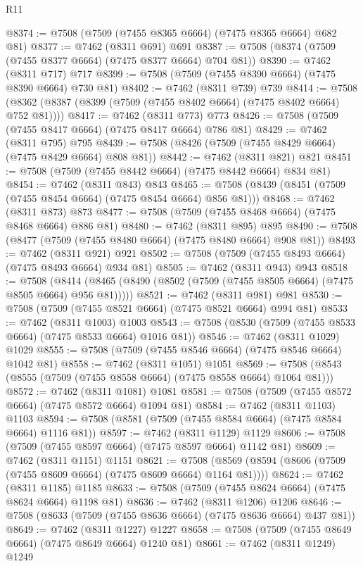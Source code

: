 \begin{lexlean}{R11}
\begin{coremodule}
@8374 := @7508 (@7509 (@7455 @8365 @6664) (@7475 @8365 @6664) @682 @81)
@8377 := @7462 (@8311 @691) @691
@8387 := @7508 (@8374 (@7509 (@7455 @8377 @6664) (@7475 @8377 @6664) @704 @81))
@8390 := @7462 (@8311 @717) @717
@8399 := @7508 (@7509 (@7455 @8390 @6664) (@7475 @8390 @6664) @730 @81)
@8402 := @7462 (@8311 @739) @739
@8414 := @7508 (@8362 (@8387 (@8399 (@7509 (@7455 @8402 @6664) (@7475 @8402 @6664) @752 @81))))
@8417 := @7462 (@8311 @773) @773
@8426 := @7508 (@7509 (@7455 @8417 @6664) (@7475 @8417 @6664) @786 @81)
@8429 := @7462 (@8311 @795) @795
@8439 := @7508 (@8426 (@7509 (@7455 @8429 @6664) (@7475 @8429 @6664) @808 @81))
@8442 := @7462 (@8311 @821) @821
@8451 := @7508 (@7509 (@7455 @8442 @6664) (@7475 @8442 @6664) @834 @81)
@8454 := @7462 (@8311 @843) @843
@8465 := @7508 (@8439 (@8451 (@7509 (@7455 @8454 @6664) (@7475 @8454 @6664) @856 @81)))
@8468 := @7462 (@8311 @873) @873
@8477 := @7508 (@7509 (@7455 @8468 @6664) (@7475 @8468 @6664) @886 @81)
@8480 := @7462 (@8311 @895) @895
@8490 := @7508 (@8477 (@7509 (@7455 @8480 @6664) (@7475 @8480 @6664) @908 @81))
@8493 := @7462 (@8311 @921) @921
@8502 := @7508 (@7509 (@7455 @8493 @6664) (@7475 @8493 @6664) @934 @81)
@8505 := @7462 (@8311 @943) @943
@8518 := @7508
    (@8414 (@8465 (@8490 (@8502 (@7509 (@7455 @8505 @6664) (@7475 @8505 @6664) @956 @81)))))
@8521 := @7462 (@8311 @981) @981
@8530 := @7508 (@7509 (@7455 @8521 @6664) (@7475 @8521 @6664) @994 @81)
@8533 := @7462 (@8311 @1003) @1003
@8543 := @7508 (@8530 (@7509 (@7455 @8533 @6664) (@7475 @8533 @6664) @1016 @81))
@8546 := @7462 (@8311 @1029) @1029
@8555 := @7508 (@7509 (@7455 @8546 @6664) (@7475 @8546 @6664) @1042 @81)
@8558 := @7462 (@8311 @1051) @1051
@8569 := @7508 (@8543 (@8555 (@7509 (@7455 @8558 @6664) (@7475 @8558 @6664) @1064 @81)))
@8572 := @7462 (@8311 @1081) @1081
@8581 := @7508 (@7509 (@7455 @8572 @6664) (@7475 @8572 @6664) @1094 @81)
@8584 := @7462 (@8311 @1103) @1103
@8594 := @7508 (@8581 (@7509 (@7455 @8584 @6664) (@7475 @8584 @6664) @1116 @81))
@8597 := @7462 (@8311 @1129) @1129
@8606 := @7508 (@7509 (@7455 @8597 @6664) (@7475 @8597 @6664) @1142 @81)
@8609 := @7462 (@8311 @1151) @1151
@8621 := @7508 (@8569 (@8594 (@8606 (@7509 (@7455 @8609 @6664) (@7475 @8609 @6664) @1164 @81))))
@8624 := @7462 (@8311 @1185) @1185
@8633 := @7508 (@7509 (@7455 @8624 @6664) (@7475 @8624 @6664) @1198 @81)
@8636 := @7462 (@8311 @1206) @1206
@8646 := @7508 (@8633 (@7509 (@7455 @8636 @6664) (@7475 @8636 @6664) @437 @81))
@8649 := @7462 (@8311 @1227) @1227
@8658 := @7508 (@7509 (@7455 @8649 @6664) (@7475 @8649 @6664) @1240 @81)
@8661 := @7462 (@8311 @1249) @1249

\end{coremodule}
\end{lexlean}

